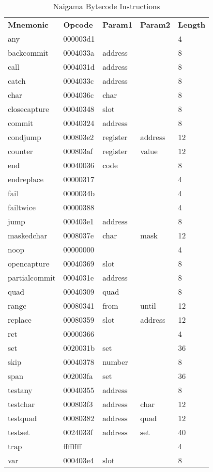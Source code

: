 
\begin{table}[]
\centering
\caption{Naigama Bytecode Instructions}
\label{tab:naig_bytecode}
\begin{tabular}{lllll}
\textbf{Mnemonic} & \textbf{Opcode} & \textbf{Param1} & \textbf{Param2} & \textbf{Length} \\
any & 000003d1 &  &   & 4 \\
backcommit & 0004033a & address &   & 8 \\
call & 0004031d & address &   & 8 \\
catch & 0004033c & address &   & 8 \\
char & 0004036c & char &   & 8 \\
closecapture & 00040348 & slot &   & 8 \\
commit & 00040324 & address &   & 8 \\
condjump & 000803e2 & register & address  & 12 \\
counter & 000803af & register & value  & 12 \\
end & 00040036 & code &   & 8 \\
endreplace & 00000317 &  &   & 4 \\
fail & 0000034b &  &   & 4 \\
failtwice & 00000388 &  &   & 4 \\
jump & 000403e1 & address &   & 8 \\
maskedchar & 0008037e & char & mask  & 12 \\
noop & 00000000 &  &   & 4 \\
opencapture & 00040369 & slot &   & 8 \\
partialcommit & 0004031e & address &   & 8 \\
quad & 00040309 & quad &   & 8 \\
range & 00080341 & from & until  & 12 \\
replace & 00080359 & slot & address  & 12 \\
ret & 00000366 &  &   & 4 \\
set & 0020031b & set &   & 36 \\
skip & 00040378 & number &   & 8 \\
span & 002003fa & set &   & 36 \\
testany & 00040355 & address &   & 8 \\
testchar & 000803f3 & address & char  & 12 \\
testquad & 00080382 & address & quad  & 12 \\
testset & 0024033f & address & set  & 40 \\
trap & ffffffff &  &   & 4 \\
var & 000403e4 & slot &   & 8 \\
\end{tabular}
\end{table}
